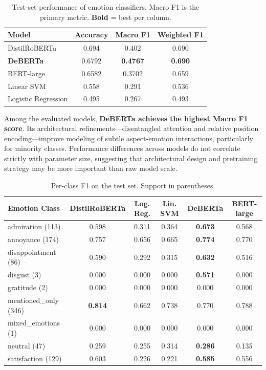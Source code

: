 \documentclass[10pt]{article}
\begin{document}
\begin{table}[H]
\centering
\caption{Test-set performance of emotion classifiers. Macro F1 is the primary metric. \textbf{Bold} = best per column.}
\small
\setlength{\tabcolsep}{10pt}
\begin{tabular}{lccc}
\toprule
\rowcolor{primary!90!black}
\color{white}\textbf{Model} & \color{white}\textbf{Accuracy} & \color{white}\textbf{Macro F1} & \color{white}\textbf{Weighted F1} \\
\midrule
DistilRoBERTa & 0.694 & 0.402 & 0.690 \\
\textbf{DeBERTa} & 0.6792 & \textbf{0.4767} & \textbf{0.690} \\
BERT-large & 0.6582 & 0.3702 & 0.659 \\
Linear SVM & 0.558 & 0.291 & 0.536 \\
Logistic Regression & 0.495 & 0.267 & 0.493 \\
\bottomrule
\end{tabular}
\end{table}

Among the evaluated models, \textbf{DeBERTa achieves the highest Macro F1 score}. Its architectural refinements---disentangled attention and relative position encoding---improve modeling of subtle aspect-emotion interactions, particularly for minority classes. Performance differences across models do not correlate strictly with parameter size, suggesting that architectural design and pretraining strategy may be more important than raw model scale.

\begin{table}[H]
\centering
\caption{Per-class F1 on the test set. Support in parentheses.}
\small
\setlength{\tabcolsep}{5pt}
\begin{tabular}{lccccc}
\toprule
\rowcolor{primary!90!black}
\color{white}\textbf{Emotion Class} & \color{white}\textbf{DistilRoBERTa} & \color{white}\textbf{Log. Reg.} & \color{white}\textbf{Lin. SVM} & \color{white}\textbf{DeBERTa} & \color{white}\textbf{BERT-large} \\
\midrule
admiration (113) & 0.598 & 0.311 & 0.364 & \textbf{0.673} & 0.568 \\
annoyance (174) & 0.757 & 0.656 & 0.665 & \textbf{0.774} & 0.770 \\
disappointment (86) & 0.590 & 0.292 & 0.315 & \textbf{0.632} & 0.516 \\
disgust (3) & 0.000 & 0.000 & 0.000 & \textbf{0.571} & 0.000 \\
gratitude (2) & 0.000 & 0.000 & 0.000 & 0.000 & 0.000 \\
mentioned\_only (346) & \textbf{0.814} & 0.662 & 0.738 & 0.770 & 0.788 \\
mixed\_emotions (1) & 0.000 & 0.000 & 0.000 & 0.000 & 0.000 \\
neutral (47) & 0.259 & 0.255 & 0.314 & \textbf{0.286} & 0.135 \\
satisfaction (129) & 0.603 & 0.226 & 0.221 & \textbf{0.585} & 0.556 \\
\bottomrule
\end{tabular}
\end{table}
\end{document}
